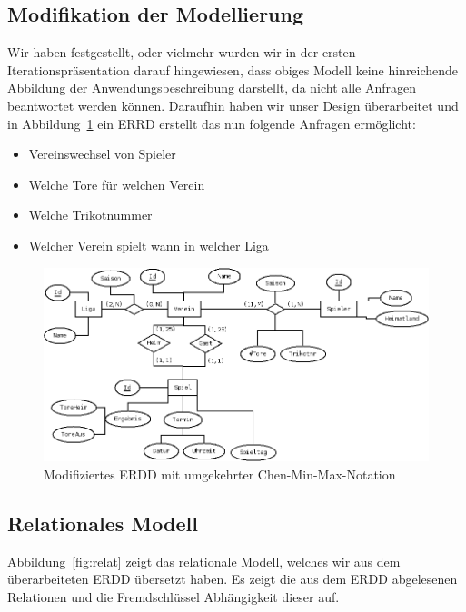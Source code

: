 \documentclass[
10pt,
a4paper
]{scrartcl}
\begin{document}
\subsection{Modifikation der Modellierung}

Wir haben festgestellt, oder vielmehr wurden wir in der ersten Iterationspräsentation darauf hingewiesen, dass obiges Modell keine hinreichende Abbildung der Anwendungsbeschreibung darstellt, da nicht alle Anfragen beantwortet werden können. Daraufhin haben wir unser Design überarbeitet und in Abbildung~\ref{fig:buli} ein ERRD erstellt das nun folgende Anfragen ermöglicht:

 \begin{itemize}
  \item Vereinswechsel von Spieler
  \item Welche Tore für welchen Verein
  \item Welche Trikotnummer
  \item Welcher Verein spielt wann in welcher Liga
\end{itemize}

\begin{figure}[H]
	\centering
  \includegraphics[scale=0.4]{bundesliga.png}
	\caption{Modifiziertes ERDD mit umgekehrter Chen-Min-Max-Notation}
	\label{fig:buli}
\end{figure}

\subsection{Relationales Modell }

Abbildung~\ref{fig:relat} zeigt das relationale Modell, welches wir aus dem überarbeiteten ERDD übersetzt haben. Es zeigt die aus dem ERDD abgelesenen Relationen und die Fremdschlüssel  Abhängigkeit dieser auf.
\end{document}
